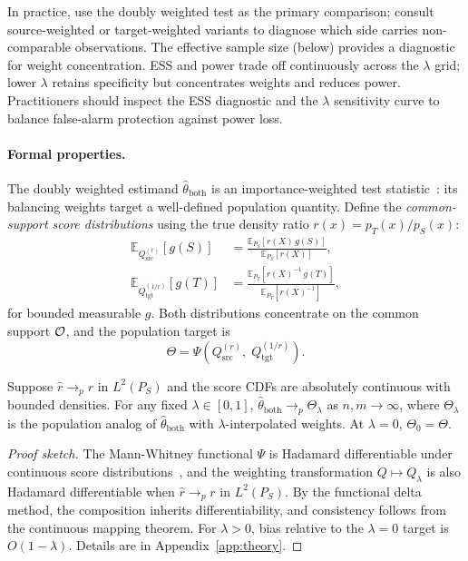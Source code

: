 In practice, use the doubly weighted test as the primary comparison; consult source-weighted or target-weighted variants to diagnose which side carries non-comparable observations. The effective sample size (below) provides a diagnostic for weight concentration. ESS and power trade off continuously across the $\lambda$ grid; lower $\lambda$ retains specificity but concentrates weights and reduces power. Practitioners should inspect the ESS diagnostic and the $\lambda$ sensitivity curve to balance false-alarm protection against power loss.

\paragraph{Formal properties.}
The doubly weighted estimand $\hat\theta_{\mathrm{both}}$ is an importance-weighted test statistic~\cite{pmlr-v161-bellot21b}: its balancing weights target a well-defined population quantity. Define the \emph{common-support score distributions} using the true density ratio $r(x) = p_T(x)/p_S(x)$:
\begin{align}
  \mathbb{E}_{Q_{\mathrm{src}}^{(r)}}[g(S)]
    &= \frac{\mathbb{E}_{P_S}[r(X)\,g(S)]}{\mathbb{E}_{P_S}[r(X)]}, \\
  \mathbb{E}_{Q_{\mathrm{tgt}}^{(1/r)}}[g(T)]
    &= \frac{\mathbb{E}_{P_T}[r(X)^{-1}\, g(T)]}{\mathbb{E}_{P_T}[r(X)^{-1}]},
\end{align}
for bounded measurable $g$. Both distributions concentrate on the common support $\mathcal{O}$, and the population target is
\begin{equation}
  \Theta = \Psi\!\left(Q_{\mathrm{src}}^{(r)},\; Q_{\mathrm{tgt}}^{(1/r)}\right).
\end{equation}

\begin{proposition}[Consistency]\label{prop:consistency}
Suppose $\hat{r} \to_p r$ in $L^2(P_S)$ and the score CDFs are absolutely continuous with bounded densities. For any fixed $\lambda \in [0, 1]$, $\hat\theta_{\mathrm{both}} \to_p \Theta_\lambda$ as $n, m \to \infty$, where $\Theta_\lambda$ is the population analog of $\hat\theta_{\mathrm{both}}$ with $\lambda$-interpolated weights. At $\lambda = 0$, $\Theta_0 = \Theta$.
\end{proposition}

\begin{proof}[Proof sketch]
The Mann-Whitney functional $\Psi$ is Hadamard differentiable under continuous score distributions~\cite{Kosorok_2008}, and the weighting transformation $Q \mapsto Q_\lambda$ is also Hadamard differentiable when $\hat{r} \to_p r$ in $L^2(P_S)$. By the functional delta method, the composition inherits differentiability, and consistency follows from the continuous mapping theorem. For $\lambda > 0$, bias relative to the $\lambda=0$ target is $O(1-\lambda)$. Details are in Appendix~\ref{app:theory}.
\end{proof}

